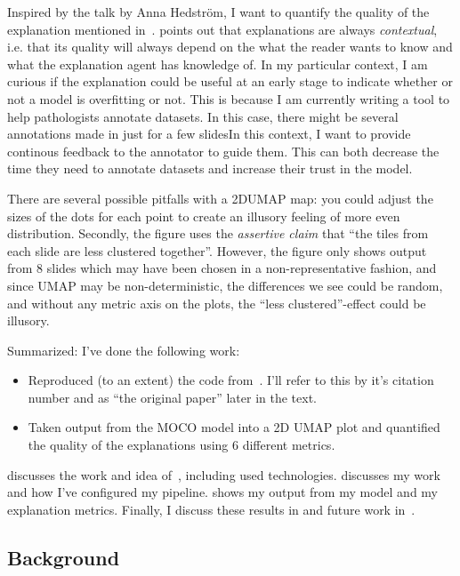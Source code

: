 \documentclass[10pt,twocolumn,letterpaper]{article}
\begin{document}
Inspired by the talk by Anna Hedstr\"{o}m, I want to quantify the quality of the explanation mentioned in~\cite{sslUMAP}. \cite{miller} points out that explanations are always \textit{contextual}, i.e. that its quality will always depend on the what the reader wants to know and what the explanation agent has knowledge of. In my particular context, I am curious if the explanation could be useful at an early stage to indicate whether or not a model is overfitting or not. This is because I am currently writing a tool to help pathologists annotate datasets. In this case, there might be several annotations made in just for a few slidesIn this context, I want to provide continous feedback to the annotator to guide them. This can both decrease the time they need to annotate datasets and increase their trust in the model.

There are several possible pitfalls with a 2D\gls{UMAP} map: you could adjust the sizes of the dots for each point to create an illusory feeling of more even distribution. Secondly, the figure uses the \textit{assertive claim} that ``the tiles from each slide are less clustered together''. However, the figure only shows output from 8 slides which may have been chosen in a non-representative fashion, and since \gls{UMAP} may be non-deterministic, the differences we see could be random, and without any metric axis on the plots, the ``less clustered''-effect could be illusory.

Summarized: I've done the following work:
\begin{itemize}
  \item Reproduced (to an extent) the code from~\cite{sslUMAP}. I'll refer to this by it's citation number and as ``the original paper'' later in the text.
  \item Taken output from the \gls{MOCO} model into a 2D \gls{UMAP} plot and quantified the quality of the explanations using 6 different metrics.
\end{itemize}

 discusses the work and idea of~\cite{sslUMAP}, including used technologies.  discusses my work and how I've configured my pipeline.  shows my output from my model and my explanation metrics. Finally, I discuss these results in  and future work in~.

\subsection{Background}\label{sec:background}
\end{document}
